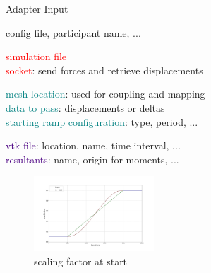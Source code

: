 \documentclass[10pt,t]{beamer}
\begin{document}
\begin{frame}{Adapter Input}

  \begin{description}[Simulation]
  \item[preCICE] \textcolor{dorange}{config file, participant name, ...}
  \item[MBDyn]      \textcolor{red}{simulation file} \\
                    \textcolor{red}{socket}: send forces and retrieve displacements \\
  \item[Simulation] \textcolor{teal}{mesh location}: used for coupling and mapping\\
                    \textcolor{teal}{data to pass}: displacements or deltas\\
                    \textcolor{teal}{starting ramp configuration}: type, period, ...
  \item[Output]     \textcolor{indigo}{vtk file}: location, name, time interval, ...\\
                    \textcolor{indigo}{resultants}: name, origin for moments, ...
  \end{description}

    \begin{figure}
        \centering
        \includegraphics[width=0.4\textwidth]{images/coeff.png}
        \caption{scaling factor at start}
    \end{figure}

\end{frame}
\end{document}
